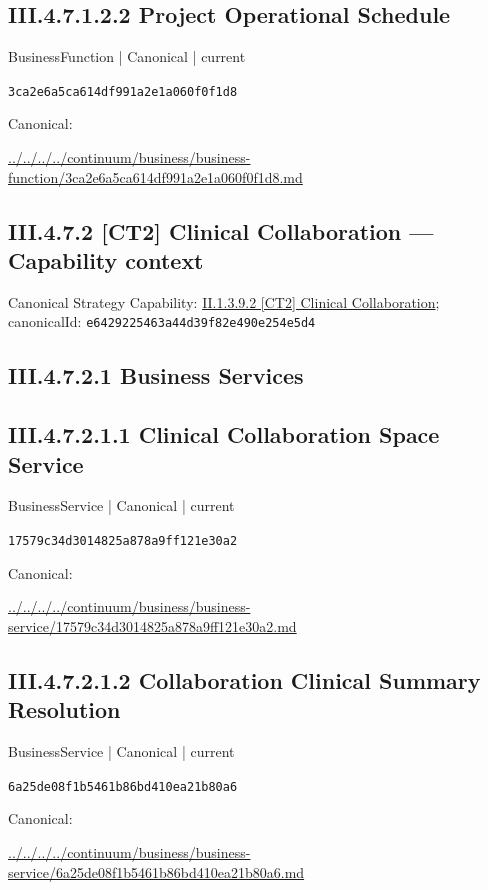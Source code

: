 \documentclass[10pt,a4paper]{article}
\begin{document}
\subsection*{III.4.7.1.2.2 Project Operational Schedule}
\label{element-3ca2e6a5ca614df991a2e1a060f0f1d8}
{\small BusinessFunction | Canonical | current}\par
\texttt{3ca2e6a5ca614df991a2e1a060f0f1d8}\par
Canonical: \par
{\footnotesize\url{../../../../continuum/business/business-function/3ca2e6a5ca614df991a2e1a060f0f1d8.md}}\par
\subsection*{III.4.7.2 [CT2] Clinical Collaboration — Capability context}
Canonical Strategy Capability: \hyperref[element-e6429225463a44d39f82e490e254e5d4]{II.1.3.9.2 [CT2] Clinical Collaboration}; canonicalId: \texttt{e6429225463a44d39f82e490e254e5d4}\par
\subsection*{III.4.7.2.1 Business Services}
\subsection*{III.4.7.2.1.1 Clinical Collaboration Space Service}
\label{element-17579c34d3014825a878a9ff121e30a2}
{\small BusinessService | Canonical | current}\par
\texttt{17579c34d3014825a878a9ff121e30a2}\par
Canonical: \par
{\footnotesize\url{../../../../continuum/business/business-service/17579c34d3014825a878a9ff121e30a2.md}}\par
\subsection*{III.4.7.2.1.2 Collaboration Clinical Summary Resolution}
\label{element-6a25de08f1b5461b86bd410ea21b80a6}
{\small BusinessService | Canonical | current}\par
\texttt{6a25de08f1b5461b86bd410ea21b80a6}\par
Canonical: \par
{\footnotesize\url{../../../../continuum/business/business-service/6a25de08f1b5461b86bd410ea21b80a6.md}}\par
\end{document}
